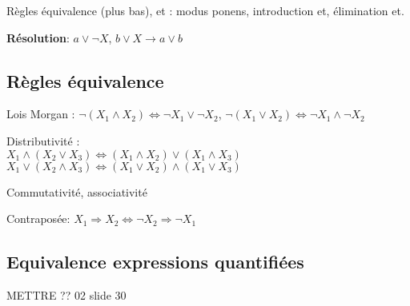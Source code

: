 Règles équivalence (plus bas), et : modus ponens, introduction et, élimination et.


\textbf{Résolution}: $a\lor \lnot X$, $b\lor X \rightarrow a\lor b$

\subsection*{Règles équivalence}

Lois Morgan : $\lnot (X_1 \land X_2) \Leftrightarrow \lnot X_1 \lor \lnot X_2$, $\lnot (X_1 \lor X_2) \Leftrightarrow \lnot X_1 \land \lnot X_2$

Distributivité : \\
$X_1 \land (X_2 \lor X_3) \Leftrightarrow (X_1 \land X_2) \lor (X_1 \land X_3)$ \\
$X_1 \lor (X_2 \land X_3) \Leftrightarrow (X_1 \lor X_2) \land (X_1 \lor X_3)$

Commutativité, associativité

Contraposée: $X_1 \Rightarrow X_2 \Leftrightarrow \lnot X_2 \Rightarrow \lnot X_1$

\subsection*{Equivalence expressions quantifiées}

METTRE ?? 02 slide 30